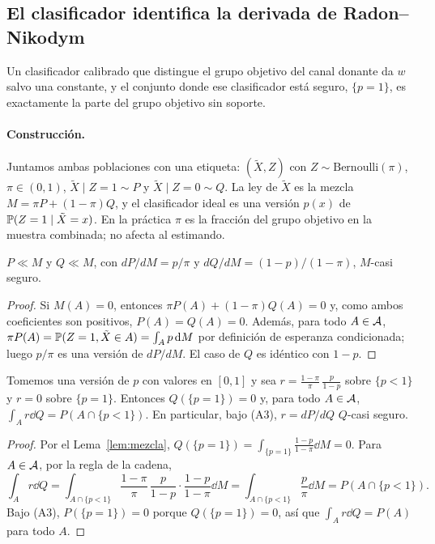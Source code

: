 \subsection{El clasificador identifica la derivada de Radon--Nikodym}\label{sec:clasificador}

Un clasificador calibrado que distingue el grupo objetivo del canal donante da $w$ salvo una constante, y el conjunto donde ese clasificador está seguro, $\{p=1\}$, es exactamente la parte del grupo objetivo sin soporte.

\paragraph{Construcción.} Juntamos ambas poblaciones con una etiqueta: $(\tilde X,Z)$ con $Z\sim\mathrm{Bernoulli}(\pi)$, $\pi\in(0,1)$, $\tilde X\mid Z=1\sim P$ y $\tilde X\mid Z=0\sim Q$. La ley de $\tilde X$ es la mezcla $M=\pi P+(1-\pi)Q$, y el clasificador ideal es una versión $p(x)$ de $\mathbb{P}(Z=1\mid\tilde X=x)$. En la práctica $\pi$ es la fracción del grupo objetivo en la muestra combinada; no afecta al estimando.

\begin{lema}\label{lem:mezcla}
$P\ll M$ y $Q\ll M$, con $dP/dM=p/\pi$ y $dQ/dM=(1-p)/(1-\pi)$, $M$-casi seguro.
\end{lema}
\begin{proof}
Si $M(A)=0$, entonces $\pi P(A)+(1-\pi)Q(A)=0$ y, como ambos coeficientes son positivos, $P(A)=Q(A)=0$. Además, para todo $A\in\mathcal{A}$, $\pi P(A)=\mathbb{P}(Z=1,\tilde X\in A)=\int_A p\,\mathrm{d} M$ por definición de esperanza condicionada; luego $p/\pi$ es una versión de $dP/dM$. El caso de $Q$ es idéntico con $1-p$.
\end{proof}

\begin{teorema}\label{teo:odds}
Tomemos una versión de $p$ con valores en $[0,1]$ y sea $r=\frac{1-\pi}{\pi}\,\frac{p}{1-p}$ sobre $\{p<1\}$ y $r=0$ sobre $\{p=1\}$. Entonces $Q(\{p=1\})=0$ y, para todo $A\in\mathcal{A}$, $\int_A r\dd Q=P(A\cap\{p<1\})$. En particular, bajo (A3), $r=dP/dQ$ $Q$-casi seguro.
\end{teorema}
\begin{proof}
Por el Lema~\ref{lem:mezcla}, $Q(\{p=1\})=\int_{\{p=1\}}\frac{1-p}{1-\pi}\dd M=0$. Para $A\in\mathcal{A}$, por la regla de la cadena,
\[
\int_A r\dd Q=\int_{A\cap\{p<1\}}\frac{1-\pi}{\pi}\,\frac{p}{1-p}\cdot\frac{1-p}{1-\pi}\dd M=\int_{A\cap\{p<1\}}\frac{p}{\pi}\dd M=P(A\cap\{p<1\}).
\]
Bajo (A3), $P(\{p=1\})=0$ porque $Q(\{p=1\})=0$, así que $\int_A r\dd Q=P(A)$ para todo $A$.
\end{proof}

